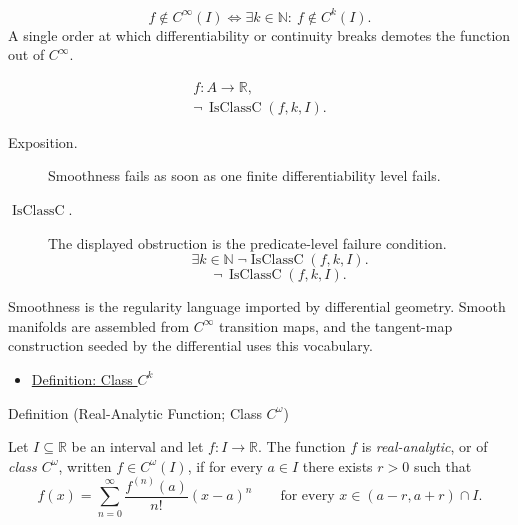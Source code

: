 \begin{remark*}
\[
  f\notin C^\infty(I)
  \Longleftrightarrow
  \exists k\in\mathbb{N}:\ f\notin C^k(I).
\]
A single order at which differentiability or continuity breaks demotes the
function out of \(C^\infty\).
\end{remark*}

\begin{remark*}
\[
\begin{aligned}
  f\colon A\to\mathbb{R},\\
\neg\,\operatorname{IsClassC}(f,k,I).
\end{aligned}
\]
\end{remark*}




\begin{remark*}
\begin{description}
  \item[Exposition.]
  Smoothness fails as soon as one finite differentiability level fails.

  \item[\(\operatorname{IsClassC}.\)]
  The displayed obstruction is the predicate-level failure condition.
  \[
  \exists k\in\mathbb{N}\;\neg\operatorname{IsClassC}(f,k,I).
  \]
  \[
  \neg\,\operatorname{IsClassC}(f,k,I).
  \]
\end{description}
\end{remark*}



\begin{remark*}[Interpretation]
Smoothness is the regularity language imported by differential geometry. Smooth manifolds are assembled from \(C^\infty\) transition maps, and the tangent-map construction seeded by the differential uses this vocabulary.
\end{remark*}

\begin{dependencies}
\begin{itemize}
  \item \hyperref[def:class-ck]{Definition: Class \(C^k\)}
\end{itemize}
\end{dependencies}

\begin{definitionbox}{Definition (Real-Analytic Function; Class \(C^\omega\))}
\begin{definition}
\label{def:class-comega}
Let \(I\subseteq\mathbb{R}\) be an interval and let \(f:I\to\mathbb{R}\). The function \(f\) is \emph{real-analytic}, or of \emph{class \(C^\omega\)}, written \(f\in C^\omega(I)\), if for every \(a\in I\) there exists \(r>0\) such that
\[
  f(x)=\sum_{n=0}^{\infty}\frac{f^{(n)}(a)}{n!}(x-a)^n
  \qquad\text{for every }x\in(a-r,a+r)\cap I.
\]
\end{definition}
\end{definitionbox}

